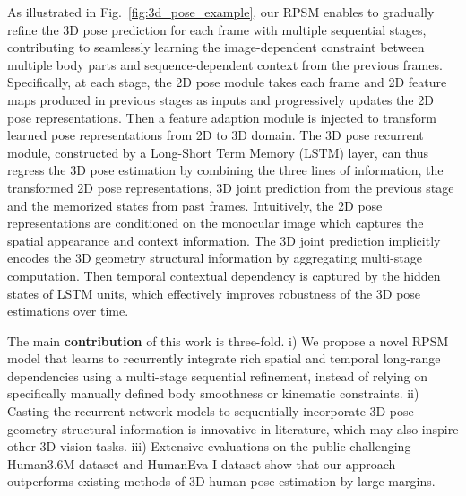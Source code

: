 \documentclass[10pt,twocolumn,letterpaper]{article}
\begin{document}
As illustrated in Fig.~\ref{fig:3d_pose_example}, our RPSM enables to gradually refine the 3D pose prediction for each frame with multiple sequential stages, contributing to seamlessly learning the image-dependent constraint between multiple body parts and sequence-dependent context from the previous frames. Specifically, at each stage, the 2D pose module takes each frame and 2D feature maps produced in previous stages as inputs and progressively updates the 2D pose representations. Then a feature adaption module is injected to transform learned pose representations from 2D to 3D domain. The 3D pose recurrent module, constructed by a Long-Short Term Memory (LSTM) layer, can thus regress the 3D pose estimation by combining the three lines of information, \ie the transformed 2D pose representations, 3D joint prediction from the previous stage and the memorized states from past frames. Intuitively, the 2D pose representations are conditioned on the monocular image which captures the spatial appearance and context information. 
The 3D joint prediction implicitly encodes the 3D geometry structural information by aggregating multi-stage computation. Then temporal contextual dependency is captured by the hidden states of LSTM units, which effectively improves robustness of the 3D pose estimations over time.



The main \textbf{contribution} of this work is three-fold. i) We propose a novel RPSM model that learns to recurrently integrate rich spatial and temporal long-range dependencies using a multi-stage sequential refinement, instead of relying on specifically manually defined body smoothness or kinematic constraints. ii) Casting the recurrent network models to sequentially incorporate 3D pose geometry structural information is innovative in literature, which may also inspire other 3D vision tasks. iii) Extensive evaluations on the public challenging Human3.6M dataset \cite{huamn3.6m} and HumanEva-I dataset \cite{sigal2010humaneva} show that our approach outperforms existing methods of 3D human pose estimation by large margins.
\end{document}
